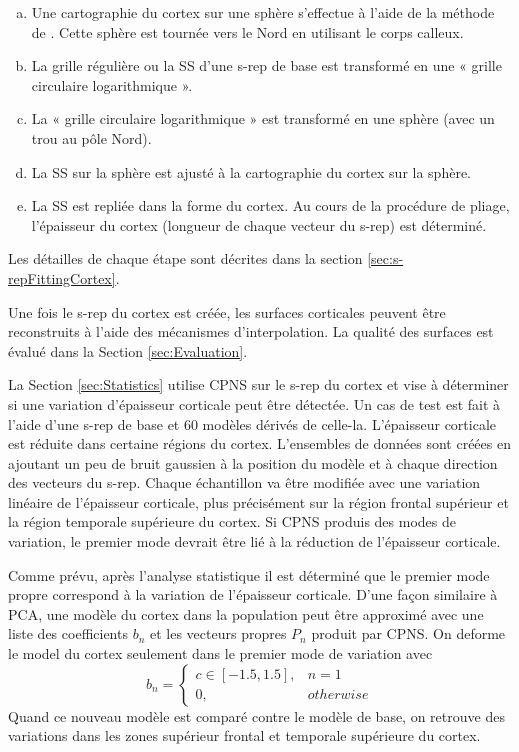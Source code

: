\begin{enumerate}[(a)]
\item Une cartographie du cortex sur une sphère s'effectue à l'aide de la méthode de \cite{fischl_cortical_1999}.
Cette sphère est tournée vers le Nord en utilisant le corps calleux.
\item La grille régulière ou la SS d'une s-rep de base est transformé en une « grille circulaire logarithmique ».
\item La « grille circulaire logarithmique » est transformé en une sphère (avec un trou au pôle Nord).
\item La SS sur la sphère est ajusté à la cartographie du cortex sur la sphère.
\item La SS est repliée dans la forme du cortex. Au cours de la procédure de pliage, l'épaisseur du cortex 
(longueur de chaque vecteur du s-rep) est déterminé.
\end{enumerate}

Les détailles de chaque étape sont décrites dans la section \ref{sec:s-repFittingCortex}.

Une fois le s-rep du cortex est créée, les surfaces corticales 
peuvent être reconstruits à l'aide des mécanismes d'interpolation.
La qualité des surfaces est évalué dans la Section \ref{sec:Evaluation}.

La Section \ref{sec:Statistics} 
utilise CPNS sur le s-rep du cortex et vise à déterminer si une variation d'épaisseur 
corticale peut être détectée.
Un cas de test est fait à l'aide d'une s-rep de base et 60 modèles dérivés de celle-la.
L'épaisseur corticale est réduite dans certaine régions du cortex.
L'ensembles de données sont créées en ajoutant un peu de bruit gaussien à la position du modèle et à chaque direction 
des vecteurs du s-rep.
Chaque échantillon va être modifiée avec une variation linéaire de l'épaisseur corticale,
plus précisément sur la région frontal supérieur et la région temporale supérieure du cortex.
Si CPNS produis des modes de variation, le premier mode devrait être lié 
à la réduction de l'épaisseur corticale.

Comme prévu, après l'analyse statistique il est déterminé que
le premier mode propre correspond à la variation de l'épaisseur corticale.
D'une façon similaire à PCA, 
une modèle du cortex dans la population peut être approximé avec
une liste des coefficients $b_n$ et les vecteurs propres $P_n$ produit 
par CPNS. On deforme le model du cortex seulement dans 
le premier mode de variation avec 
\begin{equation}
 b_n = \left\{
		  \begin{array}{lr}
			  c \in [-1.5, 1.5], & n = 1 \\
			  0, & otherwise
		  \end{array}
		  \right. 
\end{equation}
Quand ce nouveau modèle est comparé contre le modèle de base, on retrouve 
des variations dans les zones supérieur frontal et temporale supérieure du cortex. 

